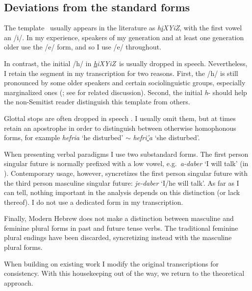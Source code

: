   \subsection{Deviations from the standard forms}
The template \thif~usually appears in the literature as \emph{h\underline{i}XYiZ}, with the first vowel an /i/. In my experience, speakers of my generation and at least one generation older use the /e/ form, and so I use /e/ throughout.

In contrast, the initial /h/ in \emph{\underline{h}iXYiZ}~is usually dropped in speech. Nevertheless, I retain the segment in my transcription for two reasons. First, the /h/ is still pronounced by some older speakers and certain sociolinguistic groups, especially marginalized ones (\citealt{schwarzwald81biu}; see \citealt{gafter14phd} for related discussion). Second, the initial \emph{h}- should help the non-Semitist reader distinguish this template from others.

Glottal stops are often dropped in speech \citep{faust05,faust15iatl}. I usually omit them, but at times retain an apostrophe in order to distinguish between otherwise homophonous forms, for example \emph{hefria} `he disturbed' $\sim$ \emph{hefri\underline{'}a} `she disturbed'.

When presenting verbal paradigms I use two substandard forms. The first person singular future is normally prefixed with a low vowel, e.g.~\emph{a-daber} `I will talk' (in ). Contemporary usage, however, syncretizes the first person singular future with the third person masculine singular future: \emph{je-daber} `I/he will talk'. As far as I can tell, nothing important in the analysis depends on this distinction (or lack thereof). I do not use a dedicated  form in my transcription.

Finally, Modern Hebrew does not make a distinction between masculine and feminine plural forms in past and future tense verbs. The traditional feminine plural endings have been discarded, syncretizing instead with the masculine plural forms.

When building on existing work I modify the original transcriptions for consistency. With this housekeeping out of the way, we return to the theoretical approach.



